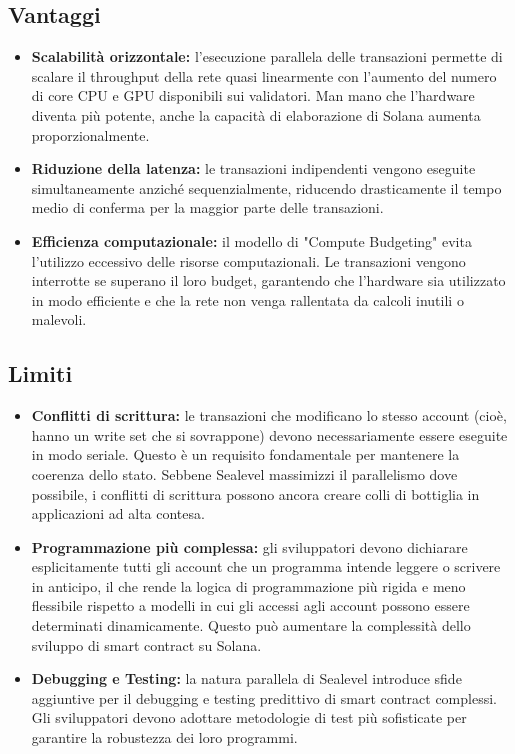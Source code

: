 \documentclass[a4paper,12pt]{report}
\begin{document}
	\subsection{Vantaggi}
	\begin{itemize}
		\item \textbf{Scalabilità orizzontale:} l’esecuzione parallela delle transazioni permette di scalare il throughput della rete quasi linearmente con l'aumento del numero di core CPU e GPU disponibili sui validatori. Man mano che l'hardware diventa più potente, anche la capacità di elaborazione di Solana aumenta proporzionalmente.
		\item \textbf{Riduzione della latenza:} le transazioni indipendenti vengono eseguite simultaneamente anziché sequenzialmente, riducendo drasticamente il tempo medio di conferma per la maggior parte delle transazioni.
		\item \textbf{Efficienza computazionale:} il modello di "Compute Budgeting" evita l’utilizzo eccessivo delle risorse computazionali. Le transazioni vengono interrotte se superano il loro budget, garantendo che l'hardware sia utilizzato in modo efficiente e che la rete non venga rallentata da calcoli inutili o malevoli.
	\end{itemize}
	
	\subsection{Limiti}
	\begin{itemize}
		\item \textbf{Conflitti di scrittura:} le transazioni che modificano lo stesso account (cioè, hanno un write set che si sovrappone) devono necessariamente essere eseguite in modo seriale. Questo è un requisito fondamentale per mantenere la coerenza dello stato. Sebbene Sealevel massimizzi il parallelismo dove possibile, i conflitti di scrittura possono ancora creare colli di bottiglia in applicazioni ad alta contesa.
		\item \textbf{Programmazione più complessa:} gli sviluppatori devono dichiarare esplicitamente tutti gli account che un programma intende leggere o scrivere in anticipo, il che rende la logica di programmazione più rigida e meno flessibile rispetto a modelli in cui gli accessi agli account possono essere determinati dinamicamente. Questo può aumentare la complessità dello sviluppo di smart contract su Solana.
		\item \textbf{Debugging e Testing:} la natura parallela di Sealevel introduce sfide aggiuntive per il debugging e testing predittivo di smart contract complessi. Gli sviluppatori devono adottare metodologie di test più sofisticate per garantire la robustezza dei loro programmi.
	\end{itemize}
	
\end{document}
